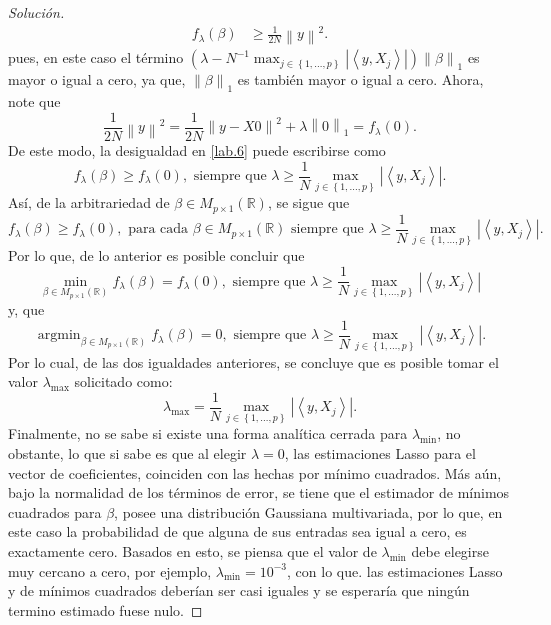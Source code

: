 \documentclass[10.5pt,notitlepage]{article}
\newenvironment{solucion}
  {\begin{proof}[Solución]}
  {\end{proof}}
\DeclareMathOperator{\argmin}{argmin}
\newcommand{\RR}{\mathbb{R}}
\newcommand{\abs}[1]{\left\lvert #1 \right\rvert}
\newcommand{\norm}[1]{\left\| #1 \right\|}
\newcommand{\inner}[1]{\left\langle #1 \right\rangle}
\newcommand{\kis}[1]{\left\{ #1 \right\}}
\newcommand{\pare}[1]{\left( #1 \right)}
\theoremstyle{plain}
\begin{document}
\begin{solucion}
\begin{align}\label{lab.6}
f_{\lambda}(\beta) &\geq  \frac{1}{2N}\norm{y}^2.
\end{align}
pues, en este caso el término \( \pare{\lambda  - N^{-1}\max_{j \in \kis{1,\hdots,p}}\abs{\inner{y,X_{j}}}}\norm{\beta}_1\) es mayor o igual a cero, ya que, \(\norm{\beta}_1\) es también mayor o igual a cero. Ahora, note que \[\frac{1}{2N}\norm{y}^2=\frac{1}{2N}\norm{y - X 0}^2 + \lambda\norm{0}_1  = f_{\lambda}(0).\]
De este modo, la desigualdad en \eqref{lab.6} puede escribirse como 
\[
f_{\lambda}(\beta) \geq f_{\lambda}(0), \text{ siempre que } \lambda \geq \frac{1}{N}\max_{j \in \kis{1,\hdots,p}}\abs{\inner{y,X_{j}}}.
\]
Así, de la arbitrariedad de \(\beta \in M_{p \times 1}(\RR)\), se sigue que
\[
f_{\lambda}(\beta) \geq f_{\lambda}(0), \text{ para cada } \beta \in M_{p \times 1}(\RR) \text{ siempre que } \lambda \geq \frac{1}{N}\max_{j \in \kis{1,\hdots,p}}\abs{\inner{y,X_{j}}}.
\]
Por lo que, de lo anterior es posible concluir que 
\[
\min_{\beta \in M_{p \times 1}(\RR)}f_{\lambda}(\beta) = f_{\lambda}(0), \text{ siempre que } \lambda \geq \frac{1}{N}\max_{j \in \kis{1,\hdots,p}}\abs{\inner{y,X_{j}}}
\]
y, que 
\[
\argmin_{\beta \in M_{p \times 1}(\RR)}f_{\lambda}(\beta) = 0, \text{ siempre que } \lambda \geq \frac{1}{N}\max_{j \in \kis{1,\hdots,p}}\abs{\inner{y,X_{j}}}.
\]
Por lo cual, de las dos igualdades anteriores, se concluye que es posible tomar el valor \(\lambda_{\max}\) solicitado como:
\[
\lambda_{\max} = \frac{1}{N}\max_{j \in \kis{1,\hdots,p}}\abs{\inner{y,X_{j}}}.
\]
Finalmente, no se sabe si existe una forma analítica cerrada para \(\lambda_{\min}\), no obstante, lo que si sabe es que al elegir \(\lambda = 0\), las estimaciones Lasso para el vector de coeficientes, coinciden con las hechas por mínimo cuadrados. Más aún, bajo la normalidad de los términos de error, se tiene que el estimador de mínimos cuadrados para \(\beta\), posee una distribución Gaussiana multivariada, por lo que, en este caso la probabilidad de que alguna de sus entradas sea igual a cero, es exactamente cero. Basados en esto, se piensa que el valor de \(\lambda_{\min}\) debe elegirse muy cercano a cero, por ejemplo, \(\lambda_{\min} = 10^{-3}\), con lo que. las estimaciones Lasso y de mínimos cuadrados deberían ser casi iguales y se esperaría que ningún termino estimado fuese nulo.

\end{solucion}
\end{document}
